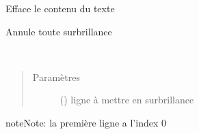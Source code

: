 \documentclass[letterpaper,10pt,french]{sphinxmanual}
\begin{document}
\begin{fulllineitems}
\begin{fulllineitems}
\label{\detokenize{widgets:widgets.TextWidget.clear}}
Efface le contenu du texte

\end{fulllineitems}


\begin{fulllineitems}
\label{\detokenize{widgets:widgets.TextWidget.clearHighlight}}
Annule toute surbrillance

\end{fulllineitems}


\begin{fulllineitems}
\label{\detokenize{widgets:widgets.TextWidget.cols}}
\end{fulllineitems}


\begin{fulllineitems}
\label{\detokenize{widgets:widgets.TextWidget.highlightLine}}~\begin{quote}\begin{description}
\item[{Paramètres}] \leavevmode
{} () \textendash{} ligne à mettre en surbrillance

\end{description}\end{quote}

\begin{sphinxadmonition}{note}{Note:}
la première ligne a l’index 0
\end{sphinxadmonition}

\end{fulllineitems}


\end{fulllineitems}
\end{document}
